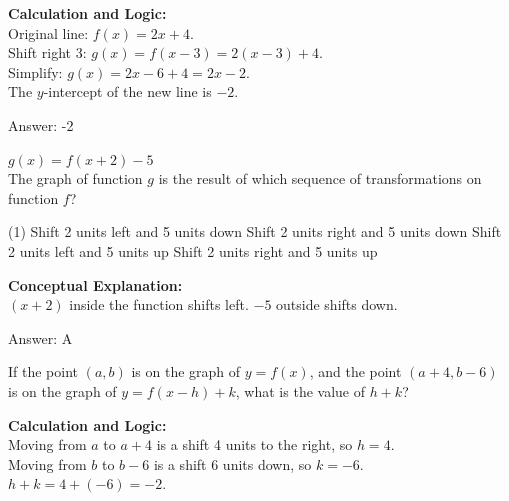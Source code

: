 \documentclass[11pt,paper=a4,answers]{exam}
\begin{document}
\begin{questions}
\begin{solution}
\textbf{Calculation and Logic:} \\
Original line: $f(x) = 2x + 4$. \\
Shift right 3: $g(x) = f(x - 3) = 2(x - 3) + 4$. \\
Simplify: $g(x) = 2x - 6 + 4 = 2x - 2$. \\
The $y$-intercept of the new line is $-2$.

\vspace{25pt}

Answer: \colorbox{yellow!100}{-2}
\end{solution}

\vspace{40pt}

\question
$g(x) = f(x + 2) - 5$ \\
The graph of function $g$ is the result of which sequence of transformations on function $f$?
\begin{tasks}(1)
    \task Shift 2 units left and 5 units down
    \task Shift 2 units right and 5 units down
    \task Shift 2 units left and 5 units up
    \task Shift 2 units right and 5 units up
\end{tasks}

\begin{solution}
\textbf{Conceptual Explanation:} \\
$(x+2)$ inside the function shifts left. $-5$ outside shifts down.

\vspace{25pt}

Answer: \colorbox{yellow!100}{A}
\end{solution}

\vspace{40pt}

\question
If the point $(a, b)$ is on the graph of $y = f(x)$, and the point $(a+4, b-6)$ is on the graph of $y = f(x-h) + k$, what is the value of $h + k$?

\begin{solution}
\textbf{Calculation and Logic:} \\
Moving from $a$ to $a+4$ is a shift 4 units to the right, so $h = 4$. \\
Moving from $b$ to $b-6$ is a shift 6 units down, so $k = -6$. \\
$h + k = 4 + (-6) = -2$.


\end{solution}
\end{questions}
\end{document}
